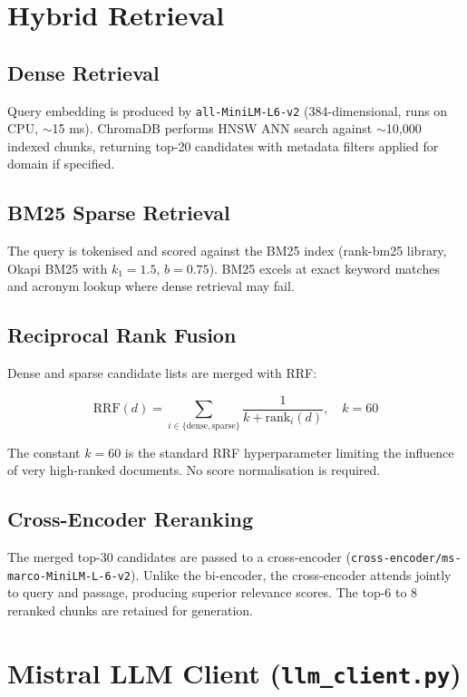 \documentclass[12pt,a4paper]{report}
\begin{document}
\section{Hybrid Retrieval}

\subsection{Dense Retrieval}

Query embedding is produced by \texttt{all-MiniLM-L6-v2} (384-dimensional, runs on CPU, $\sim$15 ms). ChromaDB performs HNSW ANN search against $\sim$10,000 indexed chunks, returning top-20 candidates with metadata filters applied for domain if specified.

\subsection{BM25 Sparse Retrieval}

The query is tokenised and scored against the BM25 index (rank-bm25 library, Okapi BM25 with $k_1 = 1.5$, $b = 0.75$). BM25 excels at exact keyword matches and acronym lookup where dense retrieval may fail.

\subsection{Reciprocal Rank Fusion}

Dense and sparse candidate lists are merged with RRF:

\begin{equation}
  \text{RRF}(d) = \sum_{i \in \{\text{dense}, \text{sparse}\}} \frac{1}{k + \text{rank}_i(d)}, \quad k = 60
\end{equation}

The constant $k=60$ is the standard RRF hyperparameter limiting the influence of very high-ranked documents. No score normalisation is required.

\subsection{Cross-Encoder Reranking}

The merged top-30 candidates are passed to a cross-encoder (\texttt{cross-encoder/ms-marco-MiniLM-L-6-v2}). Unlike the bi-encoder, the cross-encoder attends jointly to query and passage, producing superior relevance scores. The top-6 to 8 reranked chunks are retained for generation.

\section{Mistral LLM Client (\texttt{llm\_client.py})}
\end{document}
